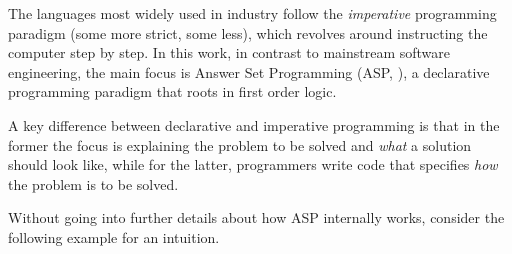\documentclass{vutinfth} %
\begin{document}
The languages most widely used in industry follow the \emph{imperative} programming paradigm (some more strict, some less), which revolves around instructing the computer step by step. In this work, in contrast to mainstream software engineering, the main focus is Answer Set Programming (ASP, \cite{stable}), a declarative programming paradigm that roots in first order logic.

A key difference between declarative and imperative programming is that in the former the focus is explaining the problem to be solved and \emph{what} a solution should look like, while for the latter, programmers write code that specifies \emph{how} the problem is to be solved.

Without going into further details about how ASP internally works, consider the following example for an intuition.
\end{document}
